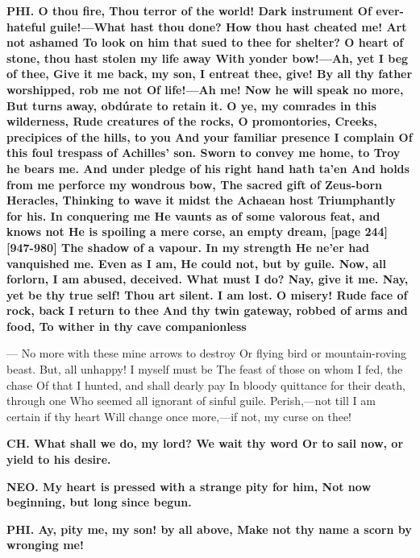 \documentclass[11pt,letter]{book}
\begin{document}
\par \textbf{PHI. O thou fire, Thou terror of the world! Dark instrument Of ever-hateful guile!—What hast thou done? How thou hast cheated me! Art not ashamed To look on him that sued to thee for shelter? O heart of stone, thou hast stolen my life away With yonder bow!—Ah, yet I beg of thee, Give it me back, my son, I entreat thee, give! By all thy father worshipped, rob me not Of life!—Ah me! Now he will speak no more, But turns away, obdúrate to retain it. O ye, my comrades in this wilderness, Rude creatures of the rocks, O promontories, Creeks, precipices of the hills, to you And your familiar presence I complain Of this foul trespass of Achilles’ son. Sworn to convey me home, to Troy he bears me. And under pledge of his right hand hath ta’en And holds from me perforce my wondrous bow, The sacred gift of Zeus-born Heracles, Thinking to wave it midst the Achaean host Triumphantly for his. In conquering me He vaunts as of some valorous feat, and knows not He is spoiling a mere corse, an empty dream, [page 244][947-980] The shadow of a vapour. In my strength He ne’er had vanquished me. Even as I am, He could not, but by guile. Now, all forlorn, I am abused, deceived. What must I do? Nay, give it me. Nay, yet be thy true self! Thou art silent. I am lost. O misery! Rude face of rock, back I return to thee And thy twin gateway, robbed of arms and food, To wither in thy cave companionless}
\par  — No more with these mine arrows to destroy Or flying bird or mountain-roving beast. But, all unhappy! I myself must be The feast of those on whom I fed, the chase Of that I hunted, and shall dearly pay In bloody quittance for their death, through one Who seemed all ignorant of sinful guile. Perish,—not till I am certain if thy heart Will change once more,—if not, my curse on thee!

\par \textbf{CH. What shall we do, my lord? We wait thy word Or to sail now, or yield to his desire.}
\par 

\par \textbf{NEO. My heart is pressed with a strange pity for him, Not now beginning, but long since begun.}
\par 

\par \textbf{PHI. Ay, pity me, my son! by all above, Make not thy name a scorn by wronging me!}
\par 
\end{document}
